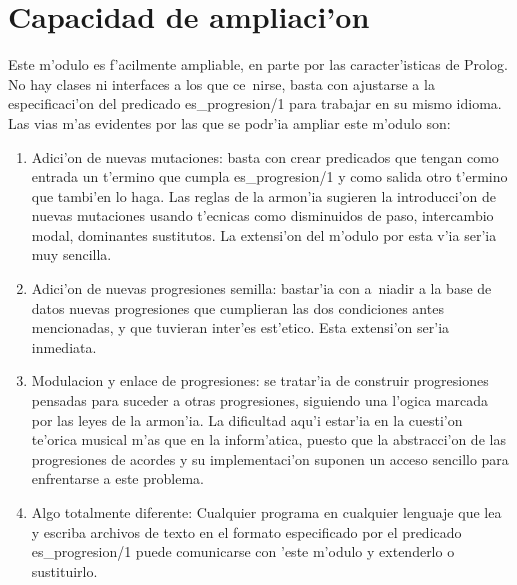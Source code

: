 \section {Capacidad de ampliaci'on}
Este m'odulo es f'acilmente ampliable, en parte por las caracter'isticas de Prolog. No hay clases ni interfaces a los que ce~nirse, basta con ajustarse a la especificaci'on del predicado es\_progresion/1 para trabajar en su mismo idioma. Las vias m'as evidentes por las que se podr'ia ampliar este m'odulo son:
        \begin{enumerate}
        \item Adici'on de nuevas mutaciones: basta con crear predicados que tengan como entrada un t'ermino que cumpla es\_progresion/1 y como salida otro t'ermino que tambi'en lo haga. Las reglas de la armon'ia sugieren la introducci'on de nuevas mutaciones usando t'ecnicas como disminuidos de paso, intercambio modal, dominantes sustitutos. La extensi'on del m'odulo por esta v'ia ser'ia muy sencilla.
        \item Adici'on de nuevas progresiones semilla: bastar'ia con a~niadir a la base de datos nuevas progresiones que cumplieran las dos condiciones antes mencionadas, y que tuvieran inter'es est'etico. Esta extensi'on ser'ia inmediata.
        \item Modulacion y enlace de progresiones: se tratar'ia de construir progresiones pensadas para suceder a otras progresiones, siguiendo una l'ogica marcada por las leyes de la armon'ia. La dificultad aqu'i estar'ia en la cuesti'on te'orica musical m'as que en la inform'atica, puesto que la abstracci'on de las progresiones de acordes y su implementaci'on suponen un acceso sencillo para enfrentarse a este problema.
        \item Algo totalmente diferente: Cualquier programa en cualquier lenguaje que lea y escriba archivos de texto en el formato especificado por el predicado es\_progresion/1 puede comunicarse con 'este m'odulo y extenderlo o sustituirlo.
        \end{enumerate}
